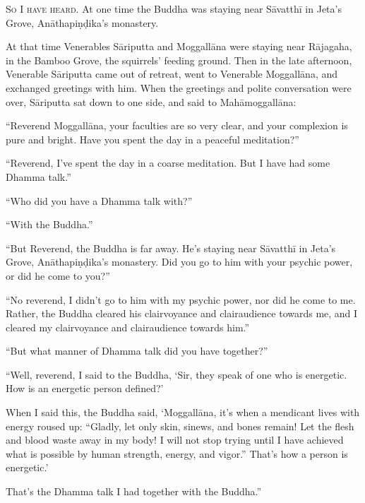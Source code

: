 \documentclass[12pt,openany]{book}%
\newcommand*{\scevam}[1]{\textsc{#1}}
\begin{document}
\scevam{So I have heard. }At one time the Buddha was staying near \textsanskrit{Sāvatthī} in Jeta’s Grove, \textsanskrit{Anāthapiṇḍika}’s monastery. 

At that time Venerables \textsanskrit{Sāriputta} and \textsanskrit{Moggallāna} were staying near \textsanskrit{Rājagaha}, in the Bamboo Grove, the squirrels’ feeding ground. Then in the late afternoon, Venerable \textsanskrit{Sāriputta} came out of retreat, went to Venerable \textsanskrit{Moggallāna}, and exchanged greetings with him. When the greetings and polite conversation were over, \textsanskrit{Sāriputta} sat down to one side, and said to \textsanskrit{Mahāmoggallāna}: 

“Reverend \textsanskrit{Moggallāna}, your faculties are so very clear, and your complexion is pure and bright. Have you spent the day in a peaceful meditation?” 

“Reverend, I’ve spent the day in a coarse meditation. But I have had some Dhamma talk.” 

“Who did you have a Dhamma talk with?” 

“With the Buddha.” 

“But Reverend, the Buddha is far away. He’s staying near \textsanskrit{Sāvatthī} in Jeta’s Grove, \textsanskrit{Anāthapiṇḍika}’s monastery. Did you go to him with your psychic power, or did he come to you?” 

“No reverend, I didn’t go to him with my psychic power, nor did he come to me. Rather, the Buddha cleared his clairvoyance and clairaudience towards me, and I cleared my clairvoyance and clairaudience towards him.” 

“But what manner of Dhamma talk did you have together?” 

“Well, reverend, I said to the Buddha, ‘Sir, they speak of one who is energetic. How is an energetic person defined?’ 

When I said this, the Buddha said, ‘\textsanskrit{Moggallāna}, it’s when a mendicant lives with energy roused up: “Gladly, let only skin, sinews, and bones remain! Let the flesh and blood waste away in my body! I will not stop trying until I have achieved what is possible by human strength, energy, and vigor.” That’s how a person is energetic.’ 

That’s the Dhamma talk I had together with the Buddha.” 
\end{document}
